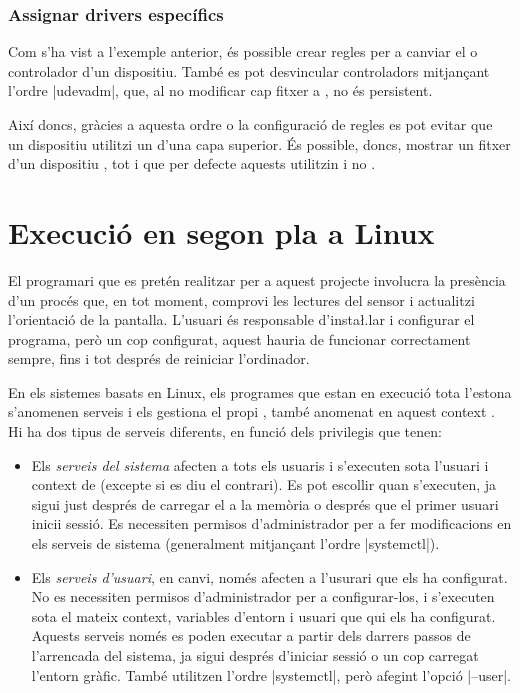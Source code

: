 \subsubsection*{Assignar drivers específics}

Com s'ha vist a l'exemple anterior, és possible crear regles  per a
canviar el  o controlador d'un dispositiu. També es pot desvincular
controladors mitjançant l'ordre \ord|udevadm|, que, al no modificar cap fitxer
a , no és persistent.

Així doncs, gràcies a aquesta ordre o la configuració de regles 
es pot evitar que un dispositiu utilitzi un  d'una capa superior.
És possible, doncs, mostrar un fitxer  d'un dispositiu
 \cite{unbindingHid}, tot i que per defecte aquests utilitzin
 i no .

\section{Execució en segon pla a Linux}
\label{subsec:systemd}

El programari que es pretén realitzar per a aquest projecte involucra la
presència d'un procés que, en tot moment, comprovi les lectures del sensor i
actualitzi l'orientació de la pantalla. L'usuari és responsable d'insta\l.lar i
configurar el programa, però un cop configurat, aquest hauria de funcionar
correctament sempre, fins i tot després de reiniciar l'ordinador.

En els sistemes basats en Linux, els programes que estan en execució tota
l'estona s'anomenen serveis i els gestiona el propi , també anomenat
en aquest context  \cite{Systemd}. Hi ha dos tipus de serveis
diferents, en funció dels privilegis que tenen:

\begin{itemize}
    \item Els \emph{serveis del sistema} afecten a tots els usuaris i
    s'executen sota l'usuari i context de  (excepte si es diu
    el contrari). Es pot escollir quan s'executen, ja sigui just després de
    carregar el  a la memòria o després que el primer usuari
    inicii sessió. Es necessiten permisos d'administrador per a fer modificacions
    en els serveis de sistema (generalment mitjançant l'ordre \ord|systemctl|).
    \item Els \emph{serveis d'usuari}, en canvi, només afecten a l'usurari
    que els ha configurat. No es necessiten permisos d'administrador per a
    configurar-los, i s'executen sota el mateix context, variables d'entorn i
    usuari que qui els ha configurat. Aquests serveis només es poden executar a
    partir dels darrers passos de l'arrencada del sistema, ja sigui després
    d'iniciar sessió o un cop carregat l'entorn gràfic. També utilitzen l'ordre
    \ord|systemctl|, però afegint l'opció \ord|--user|.
\end{itemize}


